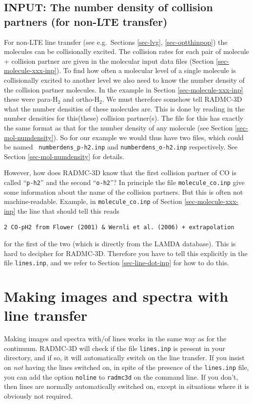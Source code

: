 \documentclass{report}
\newenvironment{asciibox}%
  {\begin{list}{}{%
    \setlength{\topsep}{0.5em}%
    \setlength{\parskip}{0em}%
    \setlength{\parsep}{0em}%
    \setlength{\itemsep}{0em}%
    \setlength{\rightmargin}{0em}%
    \setlength{\leftmargin}{3.0em}%
    \setlength{\labelsep}{1em}%
    \setlength{\labelwidth}{2em}%
  }\normalfont\footnotesize\item}
  {\end{list}}
\begin{document}
\subsection{INPUT: The number density of collision partners (for non-LTE transfer)}
\label{sec-collpartner}
%
For non-LTE line transfer (see e.g.~Sections \ref{sec-lvg},
\ref{sec-optthinpop}) the molecules can be collisionally excited. The
collision rates for each pair of molecule + collision partner are given in
the molecular input data files (Section \ref{sec-molecule-xxx-inp}). To find
how often a molecular level of a single molecule is collisionally excited to
another level we also need to know the number density of the collision
partner molecules. In the example in Section \ref{sec-molecule-xxx-inp}
these were para-H$_2$ and ortho-H$_2$. We must therefore somehow tell
RADMC-3D what the number densities of these molecules are. This is done by
reading in the number densities for this(these) collision partner(s).  The
file for this has exactly the same format as that for the number density of
any molecule (see Section \ref{sec-mol-numdensity}). So for our example we
would thus have two files, which could be named {\small\tt
  numberdens\_p-h2.inp} and {\small\tt numberdens\_o-h2.inp} respectively. 
See Section \ref{sec-mol-numdensity} for details.

However, how does RADMC-3D know that the first collision partner of CO is
called ``{\small\tt p-h2}'' and the second ``{\small\tt o-h2}''?  In
principle the file {\small\tt molecule\_co.inp} give some information about
the name of the collision partners. But this is often not machine-readable.
Example, in {\small\tt molecule\_co.inp} of Section
\ref{sec-molecule-xxx-inp} the line that should tell this reads
\begin{asciibox}\begin{verbatim}
2 CO-pH2 from Flower (2001) & Wernli et al. (2006) + extrapolation
\end{verbatim}\end{asciibox}
for the first of the two (which is directly from the LAMDA database).
This is hard to decipher for RADMC-3D. Therefore you have to tell this
explicitly in the file {\small\tt lines.inp}, and we refer to
Section \ref{sec-line-dot-inp} for how to do this.


\section{Making images and spectra with line transfer}
Making images and spectra with/of lines works in the same way as for the
continuum. RADMC-3D will check if the file {\small\tt lines.inp} is present
in your directory, and if so, it will automatically switch on the line
transfer. If you insist on {\em not} having the lines switched on, in spite
of the presence of the {\small\tt lines.inp} file, you can add the
option {\small\tt noline} to {\small\tt radmc3d} on the command line. If
you don't, then lines are normally automatically switched on, except in 
situations where it is obviously not required.
\end{document}
